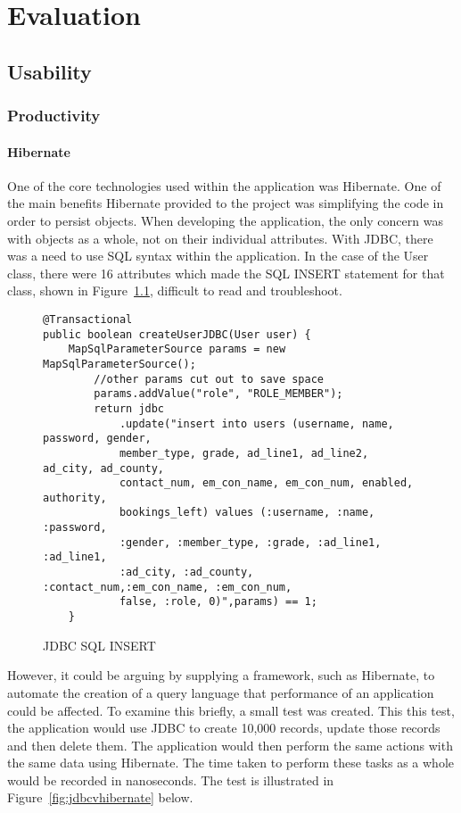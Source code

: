 \chapter{Evaluation}
\label{evaluation}


\section{Usability}
\subsection{Productivity}

\subsubsection{Hibernate}

One of the core technologies used within the application was Hibernate. One of the main benefits Hibernate provided to the project was simplifying the code in order to persist objects. When developing the application, the only concern was with objects as a whole, not on their individual attributes. With JDBC, there was a need to use SQL syntax within the application. In the case of the User class, there were 16 attributes which made the SQL INSERT statement for that class, shown in Figure~\ref{fig:jdbcsql}, difficult to read and troubleshoot.

\begin{figure}[H]
\begin{lstlisting}
@Transactional
public boolean createUserJDBC(User user) {
	MapSqlParameterSource params = new MapSqlParameterSource();
		//other params cut out to save space
		params.addValue("role", "ROLE_MEMBER");
		return jdbc
			.update("insert into users (username, name, password, gender, 
			member_type, grade, ad_line1, ad_line2, ad_city, ad_county,
			contact_num, em_con_name, em_con_num, enabled, authority,
			bookings_left) values (:username, :name, :password, 
			:gender, :member_type, :grade, :ad_line1, :ad_line1, 
			:ad_city, :ad_county, :contact_num,:em_con_name, :em_con_num,
			false, :role, 0)",params) == 1;
	}
\end{lstlisting}
\caption{JDBC SQL INSERT}
\label{fig:jdbcsql}
\end{figure}

However, it could be arguing by supplying a framework, such as Hibernate, to automate the creation of a query language that performance of an application could be affected. To examine this briefly, a small test was created. This this test, the application would use JDBC to create 10,000 records, update those records and then delete them. The application would then perform the same actions with the same data using Hibernate. The time taken to perform these tasks as a whole would be recorded in nanoseconds. The test is illustrated in Figure~\ref{fig:jdbcvhibernate} below.

